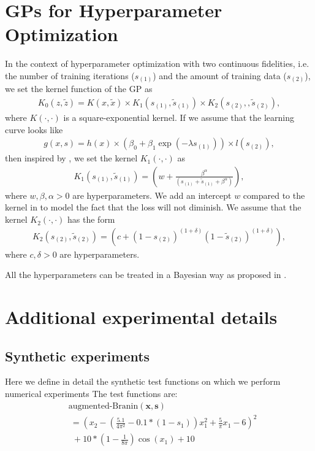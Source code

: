 \documentclass[letterpaper]{article}
\newcommand{\x}{\mathbf{x}}
\newcommand{\s}{\mathbf{s}}
\theoremstyle{definition}
\numberwithin{equation}{section}
\begin{document}
\section{GPs for Hyperparameter Optimization}
\label{sect:gp-ho}
In the context of hyperparameter optimization with two continuous fidelities, i.e. the number of training iterations ($s_{(1)}$) and the amount of training data ($s_{(2)}$), we set the kernel function of the GP as
\begin{eqnarray*}
K_{0}(z, \tilde z) = K(x, \tilde x) \times K_1(s_{(1)}, \tilde s_{(1)}) \times K_2(s_{(2)},, \tilde s_{(2)}),
\end{eqnarray*}
where $K(\cdot, \cdot)$ is a square-exponential kernel. If we assume that the learning curve looks like
\begin{eqnarray}
g(x, s) = h(x) \times \left(\beta_0 + \beta_1\exp{(-\lambda s_{(1)})}\right) \times l(s_{(2)}),
\label{eqn:shape}
\end{eqnarray}
then inspired by \cite{swersky2014freeze}, we set the kernel $K_1(\cdot, \cdot)$ as
\begin{eqnarray*}
K_1(s_{(1)}, \tilde s_{(1)}) = \left( w + \frac{\beta^{\alpha}}{(s_{(1)} + \tilde s_{(1)} + \beta^{\alpha})}\right),
\end{eqnarray*}
where $w, \beta, \alpha > 0$ are hyperparameters. We add an intercept $w$ compared to the kernel in \cite{swersky2014freeze} to model the fact that the loss will not diminish. We assume that the kernel $K_2(\cdot, \cdot)$ has the form
\begin{eqnarray*}
K_2(s_{(2)}, \tilde s_{(2)}) = \left(c + (1-s_{(2)})^{(1+\delta)}(1-\tilde s_{(2)})^{(1+\delta)}\right),
\end{eqnarray*}
where $c, \delta > 0$ are hyperparameters.

All the hyperparameters can be treated in a Bayesian way as proposed in \citet{snoek2012practical}.

\section{Additional experimental details}
\label{sect:addition}
\subsection{Synthetic experiments}
Here we define in detail the synthetic test functions on which we perform numerical experiments
The test functions are: 
\begin{equation*}
\begin{split}
&\text{augmented-Branin}(\x, \s) \\
&\ = \left(x_2 - \left(\frac{5.1}{4 \pi^2} - 0.1*(1-s_1)\right) x_1^2 + \frac{5}{\pi} x_1 - 6\right)^2 \\
&\ \ + 10*\left(1-\frac{1}{8\pi}\right)\cos(x_1) + 10\\
\end{split}
\end{equation*}
\end{document}
